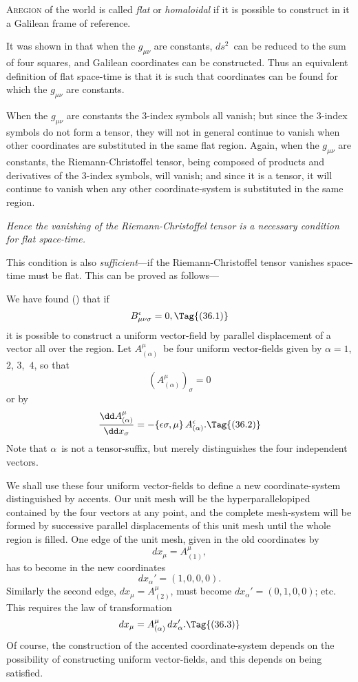 \documentclass[12pt]{book}
\begin{document}
\lettrine{\textcolor{lettrinecolour}{A}}{region} of the world is called \emph{flat} or \emph{homaloidal} if it is possible to
construct in it a Galilean frame of reference.

It was shown in  that when the $g_{\mu\nu}$ are constants, $ds^{2}$~can be reduced
to the sum of four squares, and Galilean coordinates can be constructed. Thus
an equivalent definition of flat space-time is that it is such that coordinates
can be found for which the $g_{\mu\nu}$ are constants.

When the $g_{\mu\nu}$ are constants the $3$-index symbols all vanish; but since the
$3$-index symbols do not form a tensor, they will not in general continue to
vanish when other coordinates are substituted in the same flat region. Again,
when the $g_{\mu\nu}$ are constants, the Riemann\hyp{}Christoffel tensor, being composed
%
of products and derivatives of the $3$-index symbols, will vanish; and since it
is a tensor, it will continue to vanish when any other coordinate\hyp{}system is
substituted in the same region.

\emph{Hence the vanishing of the Riemann\hyp{}Christoffel tensor is a necessary condition
for flat space-time.}

This condition is also \emph{sufficient}---if the Riemann\hyp{}Christoffel tensor vanishes
space-time must be flat. This can be proved as follows---

We have found () that if
\[
B_{\mu\nu\sigma}^{\epsilon} = 0,
\Tag{(36.1)}
\]
it is possible to construct a uniform vector\hyp{}field by parallel displacement of
a vector all over the region. Let $A_{(\alpha)}^{\mu}$~be four uniform vector\hyp{}fields given by
$\alpha = 1$, $2$, $3$,~$4$, so that
\[
(A_{(\alpha)}^{\mu})_{\sigma} = 0
\]
or by~
\[
\frac{\dd A_{(\alpha)}^{\mu}}{\dd x_{\sigma}}
= -\{\epsilon\sigma, \mu\}\, A_{(\alpha)}^{\epsilon}.
\Tag{(36.2)}
\]
Note that $\alpha$~is not a tensor\hyp{}suffix, but merely distinguishes the four independent
vectors.

We shall use these four uniform vector\hyp{}fields to define a new coordinate\hyp{}system
distinguished by accents. Our unit mesh will be the hyperparallelopiped
contained by the four vectors at any point, and the complete mesh\hyp{}system
will be formed by successive parallel displacements of this unit mesh
until the whole region is filled. One edge of the unit mesh, given in the old
coordinates by
\[
dx_{\mu} = A_{(1)}^{\mu},
\]
has to become in the new coordinates
\[
dx_{\alpha}' = (1, 0, 0, 0).
\]
Similarly the second edge, $dx_{\mu} = A_{(2)}^{\mu}$, must become $dx_{\alpha}' = (0, 1, 0, 0)$; etc.
This requires the law of transformation
\[
dx_{\mu} = A_{(\alpha)}^{\mu}\, dx_{\alpha}'.
\Tag{(36.3)}
\]
Of course, the construction of the accented coordinate\hyp{}system depends on the
possibility of constructing uniform vector\hyp{}fields, and this depends on 
%
being satisfied.
\end{document}

